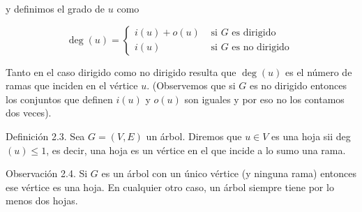 \documentclass[10pt]{article}
\begin{document}
y definimos el grado de $u$ como

$$
\operatorname{deg}(u)= \begin{cases}i(u)+o(u) & \text { si } G \text { es dirigido } \\ i(u) & \text { si } G \text { es no dirigido }\end{cases}
$$

Tanto en el caso dirigido como no dirigido resulta que $\operatorname{deg}(u)$ es el número de ramas que inciden en el vértice $u$. (Observemos que si $G$ es no dirigido entonces los conjuntos que definen $i(u)$ y $o(u)$ son iguales y por eso no los contamos dos veces).

Definición 2.3. Sea $G=(V, E)$ un árbol. Diremos que $u \in V$ es una hoja sii deg $(u) \leq 1$, es decir, una hoja es un vértice en el que incide a lo sumo una rama.

Observación 2.4. Si $G$ es un árbol con un único vértice (y ninguna rama) entonces ese vértice es una hoja. En cualquier otro caso, un árbol siempre tiene por lo menos dos hojas.
\end{document}
